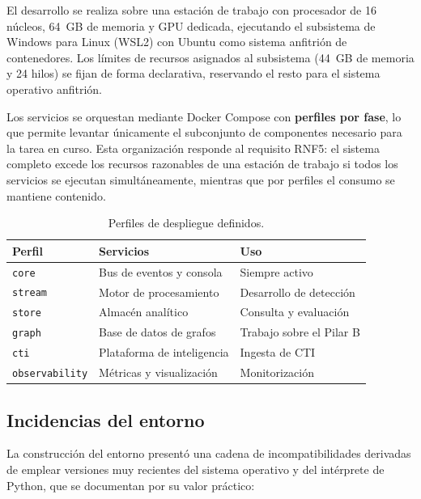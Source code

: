 El desarrollo se realiza sobre una estación de trabajo con procesador de 16 núcleos, 64~GB de
memoria y GPU dedicada, ejecutando el subsistema de Windows para Linux (WSL2) con Ubuntu como
sistema anfitrión de contenedores. Los límites de recursos asignados al subsistema
(44~GB de memoria y 24 hilos) se fijan de forma declarativa, reservando el resto para el
sistema operativo anfitrión.

Los servicios se orquestan mediante Docker Compose con \textbf{perfiles por fase}, lo que
permite levantar únicamente el subconjunto de componentes necesario para la tarea en curso.
Esta organización responde al requisito RNF5: el sistema completo excede los recursos
razonables de una estación de trabajo si todos los servicios se ejecutan simultáneamente,
mientras que por perfiles el consumo se mantiene contenido.

\begin{table}[H]
\centering
\begin{tabular}{|l|l|l|}
\hline
\textbf{Perfil} & \textbf{Servicios} & \textbf{Uso} \\
\hline
\texttt{core} & Bus de eventos y consola & Siempre activo \\
\texttt{stream} & Motor de procesamiento & Desarrollo de detección \\
\texttt{store} & Almacén analítico & Consulta y evaluación \\
\texttt{graph} & Base de datos de grafos & Trabajo sobre el Pilar B \\
\texttt{cti} & Plataforma de inteligencia & Ingesta de CTI \\
\texttt{observability} & Métricas y visualización & Monitorización \\
\hline
\end{tabular}
\caption{Perfiles de despliegue definidos.}
\label{tab:perfiles}
\end{table}

\subsection{Incidencias del entorno}

La construcción del entorno presentó una cadena de incompatibilidades derivadas de emplear
versiones muy recientes del sistema operativo y del intérprete de Python, que se documentan
por su valor práctico:


